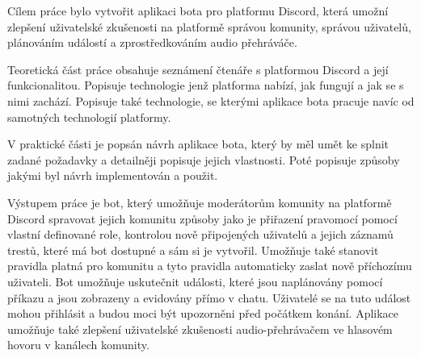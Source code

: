 \documentclass[
  program=inf,
biblatex=false,
sourcecodes=true,
joinlists=true,
  figures=true,
  tables=true,
  glossaries=true,
  index=false
]{kidiplom}
\begin{document}


\begin{kiconclusions}




Cílem práce bylo vytvořit aplikaci bota pro platformu Discord, která umožní zlepšení
uživatelské zkušenosti na platformě správou komunity, správou uživatelů, plánováním událostí a zprostředkováním audio přehráváče.

Teoretická část práce obsahuje seznámení čtenáře s platformou Discord a její funkcionalitou. Popisuje 
technologie jenž platforma nabízí, jak fungují a jak se s nimi zachází. Popisuje také technologie, se kterými
aplikace bota pracuje navíc od samotných technologií platformy.

V praktické části je popsán návrh aplikace bota, který by měl umět ke splnit zadané požadavky a detailněji
popisuje jejich vlastnosti. Poté popisuje způsoby jakými byl návrh implementován a použit.

Výstupem práce je bot, který umožňuje moderátorům komunity na platformě Discord spravovat jejich komunitu způsoby
jako je přiřazení pravomocí pomocí vlastní definované role, kontrolou nově připojených uživatelů a jejich záznamů trestů, které má bot dostupné a sám
si je vytvořil. Umožňuje také stanovit pravidla platná pro komunitu a tyto pravidla automaticky zaslat nově příchozímu uživateli.
Bot umožňuje uskutečnit události, které jsou naplánovány pomocí příkazu a jsou zobrazeny a evidovány přímo v chatu. Uživatelé 
se na tuto událost mohou přihlásit a budou moci být upozorněni před počátkem konání. Aplikace umožňuje 
také zlepšení uživatelské zkušenosti audio-přehrávačem ve hlasovém hovoru v kanálech komunity.
\end{kiconclusions}
\end{document}
